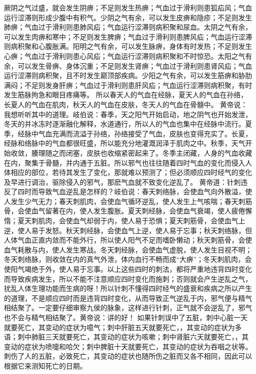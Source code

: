 \documentclass[a4paper,12pt,UTF8,twoside]{ctexbook}
\begin{document}
厥阴之气过盛，就会发生阴痹；不足则发生热痹；气血过于滑利则患狐疝风；气血运行涩滞则形成少腹中有积气。少阴之气有余，可以发生皮痹和隐疹；不足则发生肺痹；气血过于滑利则患肺风疝；气血运行涩滞则病积聚和尿血。太阴之气有余，可以发生肉痹和寒中；不足则发生脾痹；气血过于滑利则患脾风疝；气血运行涩滞则病积聚和心腹胀满。阳明之气有余，可以发生脉痹，身体有时发热；不足则发生心痹；气血过于滑利则患心风疝；气血运行涩滞则病积聚和不时惊恐。太阳之气有余，可以发生骨痹、身体沉重；不足则发生肾痹；气血过于滑利则患肾风疝；气血运行涩滞则病积聚，且不时发生巅顶部疾病。少阳之气有余，可以发生筋痹和胁肋满闷；不足则发身肝痹；气血过于滑利则患肝风疝；气血运行涩滞则病积聚，有时发生筋脉拘急和眼目疼痛等。
所以春天人的气血在经脉，夏天人的气血在孙络，长夏人的气血在肌肉，秋天人的气血在皮肤，冬天人的气血在骨髓中。
黄帝说：我想听听其中的道理。岐伯说：春季，天之阳气开始启动，地之阴气也开始发泄，冬天的并冰冻时逐渐融化解释，水道通行，所以人的气血也集中在经脉中流行。夏季，经脉中气血充满而流溢于孙络，孙络接受了气血，皮肤也变得充实了。长夏，经脉和络脉中的气血都很旺盛，所以能充分地灌溉润泽于肌肉之中。秋季，天气开始收敛，腠理随之而闭塞，皮肤也收缩紧密起来了。冬季主闭藏，人身的气血收藏在内，聚集于骨髓，并内通于五脏。所以邪气也往往随着四时气血的变化而侵入人体相应的部位，若待其发生了变化，那就难以预测了；但必须顺应四时经气的变化及早进行调治，驱除侵入的邪气，那麽气血就不致变化逆乱了。
黄帝道：针刺违反了四时而导致气血逆乱是怎样的？岐伯说：春天刺络脉，会使血气向外散溢，使人发生少气无力；春天刺肌肉，会使血气循环逆乱，使人发生上气咳喘；春天刺筋骨，会使血气留著在内，使人发生腹胀。夏天刺经脉，会使血气衰竭，使人疲倦懈惰；夏天刺肌肉，会使血气却弱于内，使人易于恐惧；夏天刺筋骨，会使血气上逆，使人易于发怒。秋天刺经脉，会使血气上逆，使人易于忘事；秋天刺络脉，但人体气血正直内敛而不能外行，所以使人阳气不足而嗜卧懒动；秋天刺筋骨，会使血气耗散与内，使人发生寒战。冬天刺经脉，会使血气虚脱，使人发生目视不明；冬天刺络脉，则收敛在内的真气外泄，体内血行不畅而成“大痹”；冬天刺肌肉，会使阳气竭绝于外，使人易于忘事。以上这些四时的刺法，都将严重地违背四时变化而导致疾病发生，所以不能不注意顺应四时变化而施刺；否则就会产生逆乱之气，扰乱人体生理功能而生病的呀！所以针刺不懂得四时经气的盛衰和疾病之所以产生的道理，不是顺应四时而是违背四时变化，从而导致正气逆乱于内，邪气便与精气相结聚了。一定要仔细审察九侯的脉象，这样进行针刺，正气就不会逆乱了，邪气也不会与精气相结聚了。黄帝说：讲的好！
如果针刺误中了五脏，刺中心脏一天就要死亡，其变动的症状为噫气；刺中肝脏五天就要死亡，，其变动的症状为多语；刺中肺脏三天就要死亡，其变动的症状为咳嗽；刺中肾脏六天就要死亡，，其变动的症状为喷嚏和哈欠；刺中脾脏十天就要死亡，其变动的症状为吞咽之状等。刺伤了人的五脏，必致死亡，其变动的症状也随所伤之脏而又各不相同，因此可以根据它来测知死亡的日期。
\end{document}
